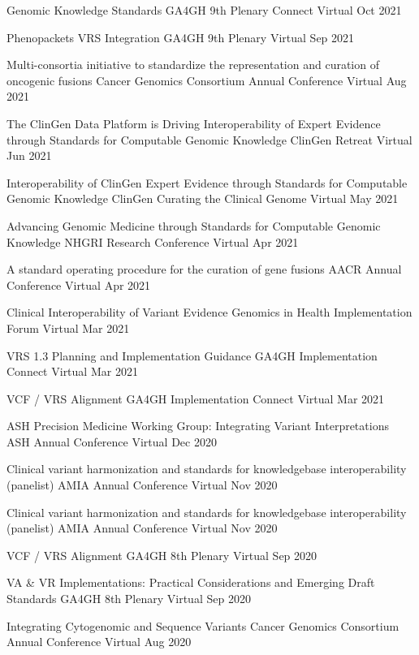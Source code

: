 \invited
{Genomic Knowledge Standards}
{GA4GH 9th Plenary Connect}
{Virtual}
{Oct 2021}

\invited
{Phenopackets VRS Integration}
{GA4GH 9th Plenary}
{Virtual}
{Sep 2021}

\oral
{Multi-consortia initiative to standardize the representation and curation of oncogenic fusions}
{Cancer Genomics Consortium Annual Conference}
{Virtual}
{Aug 2021}

\oral
{The ClinGen Data Platform is Driving Interoperability of Expert Evidence through Standards for Computable Genomic Knowledge}
{ClinGen Retreat}
{Virtual}
{Jun 2021}

\oral
{Interoperability of ClinGen Expert Evidence through Standards for Computable Genomic Knowledge}
{ClinGen Curating the Clinical Genome}
{Virtual}
{May 2021}

\poster
{Advancing Genomic Medicine through Standards for Computable Genomic Knowledge}
{NHGRI Research Conference}
{Virtual}
{Apr 2021}

\poster
{A standard operating procedure for the curation of gene fusions}
{AACR Annual Conference}
{Virtual}
{Apr 2021}

\invited
{Clinical Interoperability of Variant Evidence}
{Genomics in Health Implementation Forum}
{Virtual}
{Mar 2021}

\invited
{VRS 1.3 Planning and Implementation Guidance}
{GA4GH Implementation Connect}
{Virtual}
{Mar 2021}

\invited
{VCF / VRS Alignment}
{GA4GH Implementation Connect}
{Virtual}
{Mar 2021}

\invited
{ASH Precision Medicine Working Group: Integrating Variant Interpretations}
{ASH Annual Conference}
{Virtual}
{Dec 2020}

\oral
{Clinical variant harmonization and standards for knowledgebase interoperability (panelist)}
{AMIA Annual Conference}
{Virtual}
{Nov 2020}

\oral
{Clinical variant harmonization and standards for knowledgebase interoperability (panelist)}
{AMIA Annual Conference}
{Virtual}
{Nov 2020}

\invited
{VCF / VRS Alignment}
{GA4GH 8th Plenary}
{Virtual}
{Sep 2020}

\invited
{VA \& VR Implementations: Practical Considerations and Emerging Draft Standards}
{GA4GH 8th Plenary}
{Virtual}
{Sep 2020}

\oral
{Integrating Cytogenomic and Sequence Variants}
{Cancer Genomics Consortium Annual Conference}
{Virtual}
{Aug 2020}

